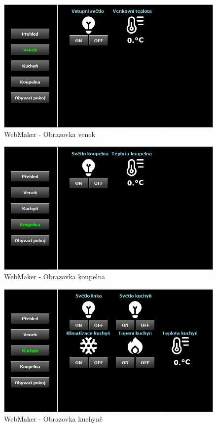 \begin{figure}[!ht]
  \begin{center}
  \includegraphics[scale=0.8]{obrazky/Venek.png}
  \end{center}
  \caption[WebMaker - Obrazovka venek]{WebMaker - Obrazovka venek}
  \label{fig:venek}
\end{figure}
\begin{figure}[!ht]
  \begin{center}
  \includegraphics[scale=0.8]{obrazky/koupelna.png}
  \end{center}
  \caption[WebMaker - Obrazovka koupelna]{WebMaker - Obrazovka koupelna}
  \label{fig:koupelna}
\end{figure}
\begin{figure}[!ht]
  \begin{center}
  \includegraphics[scale=0.8]{obrazky/Kuchyň.png}
  \end{center}
  \caption[WebMaker - Obrazovka kuchyně]{WebMaker - Obrazovka kuchyně}
  \label{fig:kuchyn}
\end{figure}
